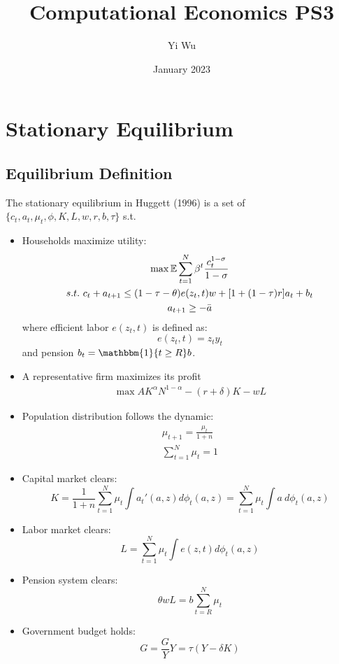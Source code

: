 \documentclass{article}
\title{Computational Economics PS3}
\author{Yi Wu}
\date{January 2023}
\begin{document}
	
	\maketitle
	
	\section{Stationary Equilibrium}
	
	\subsection{Equilibrium Definition}
	
	The stationary equilibrium in Huggett (1996) is a set of $\{c_t, a_t, \mu_t, \phi, K, L, w, r, b, \tau\}$ s.t.
	\begin{itemize}
		\item Households maximize utility:
		\begin{gather*}
			\max \mathbb{E}\sum\limits_{t=1}^N \beta^t \frac{c_t^{1-\sigma}}{1-\sigma}\\
			s.t.\ c_t+a_{t+1}\le (1-\tau-\theta)e(z_t,t)w + [1+(1-\tau)r]a_t +b_t\\
			a_{t+1}\ge -\Bar{a}
		\end{gather*}
		where efficient labor $e(z_t, t)$ is defined as:
		\begin{equation*}
			e(z_t,t)=z_ty_t
		\end{equation*}
		and pension $b_t=\mathbbm{1}\{t\ge R\}b$.
		\item A representative firm maximizes its profit
		\begin{gather*}
			\max AK^\alpha N^{1-\alpha}-(r+\delta)K - wL
		\end{gather*}
		\item Population distribution follows the dynamic:
		\begin{gather*}
			\mu_{t+1} = \frac{\mu_t}{1+n}\\
			\sum\limits_{t=1}^N \mu_t = 1
		\end{gather*}
		\item Capital market clears:
		\begin{equation*}
			K=\frac{1}{1+n}\sum\limits_{t=1}^N \mu_t\int a_t'(a,z)d\phi_t(a,z)=\sum\limits_{t=1}^N \mu_t\int a\ d\phi_t(a,z)
		\end{equation*}
		\item Labor market clears:
		\begin{equation*}
			L = \sum\limits_{t=1}^N \mu_t\int e(z,t)d\phi_t(a,z)
		\end{equation*}
		\item Pension system clears:
		\begin{equation*}
			\theta wL=b\sum\limits_{t=R}^N\mu_t
		\end{equation*}
		\item Government budget holds:
		\begin{equation}
			G=\frac{G}{Y}Y=\tau(Y-\delta K)
		\end{equation}
	\end{itemize}
	
\end{document}
